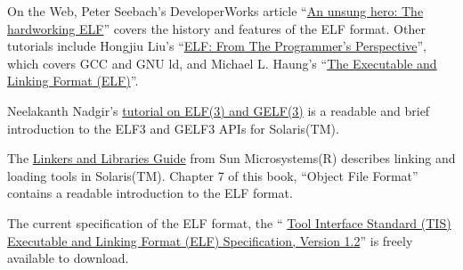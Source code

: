 \documentclass[a4paper]{report}
\newcommand{\reg}{(R)\xspace}
\newcommand{\trade}{(TM)\xspace}
\begin{document}
On the Web, Peter Seebach's DeveloperWorks article
``\href{http://www-128.ibm.com/developerworks/power/library/pa-spec12/index.html}{An
  unsung hero: The hardworking ELF}'' covers the history and features
of the ELF format.  Other tutorials include Hongjiu Liu's
``\href{http://linux4u.jinr.ru/usoft/WWW/www_debian.org/Documentation/elf/elf.html}{ELF:
  From The Programmer's Perspective}'', which covers GCC and GNU ld,
and Michael L. Haung's
``\href{http://www.cs.ucdavis.edu/~haungs/paper/node10.html}{The
  Executable and Linking Format (ELF)}''.

Neelakanth Nadgir's
\href{http://developers.sun.com/solaris/articles/elf.html}
{tutorial on ELF(3) and GELF(3)} is a readable and brief introduction
to the ELF{3} and GELF{3} APIs for Solaris\trade.

The
\href{http://docsun.cites.uiuc.edu/sun_docs/C/solaris_9/SUNWdev/LLM/toc.html}{Linkers
  and Libraries Guide} from Sun Microsystems\reg describes linking and
loading tools in Solaris\trade.  Chapter 7 of this book, ``Object File
Format'' contains a readable introduction to the ELF format.

The current specification of the ELF format, the ``%
\href{http://www.x86.org/ftp/manuals/tools/elf.pdf}{Tool Interface
  Standard (TIS) Executable and Linking Format (ELF) Specification,
  Version 1.2}'' is freely available to download.
\end{document}
